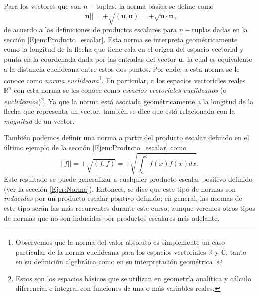 \documentclass[12pt]{article}
\begin{document}
\begin{comment}

\begin{figure}
    \centering
    \texttt{[image: ]}
    \caption{Caption}
    \label{fig:my_label}
\end{figure}

\end{comment}

\vspace{3mm}

Para los vectores que son $n-$tuplas, la norma básica se define como $$||\mathbf{u}|| = +\sqrt{(\mathbf{u},\mathbf{u})} = +\sqrt{\mathbf{u}\cdot\mathbf{u}},$$ \noindent de acuerdo a las definiciones de productos escalares para $n-$tuplas dadas en la sección \ref{Ejem:Producto_escalar}. Esta norma se interpreta geométricamente como la longitud de la flecha que tiene cola en el origen del espacio vectorial y punta en la coordenada dada por las entradas del vector $\mathbf{u}$, la cual es equivalente a la distancia euclideana entre estos dos puntos. Por ende, a esta norma se le conoce como \emph{norma euclideana}\footnote{Observemos que la norma del valor absoluto es simplemente un caso particular de la norma euclideana para los espacios vectoriales $\mathbb{R}$ y $\mathbb{C}$, tanto en su definición algebráica como en su interpretación geométrica .}. En particular, a los espacios vectoriales reales $\mathbb{R}^n$ con esta norma se les conoce como \emph{espacios vectoriales euclídeanos} (o \emph{euclideanos})\footnote{Estos son los espacios básicos que se utilizan en geometría analítica y cálculo diferencial e integral con funciones de una o más variables reales.}. Ya que la norma está asociada geométricamente a la longitud de la flecha que representa un vector, también se dice que está relacionada con la \emph{magnitud} de un vector.

\vspace{3mm}

También podemos definir una norma a partir del producto escalar definido en el último ejemplo de la sección \ref{Ejem:Producto_escalar} como $$||f|| = +\sqrt{(f,f)} = +\sqrt{\int_a^b f(x)f(x) dx}.$$ \noindent Este resultado se puede generalizar a cualquier producto escalar positivo definido (ver la sección \ref{Ejer:Norma}). Entonces, se dice que este tipo de normas son \emph{inducidas} por un producto escalar positivo definido; en general, las normas de este tipo serán las más recurrentes durante este curso, aunque veremos otros tipos de normas que no son inducidas por productos escalares más adelante.
\end{document}
